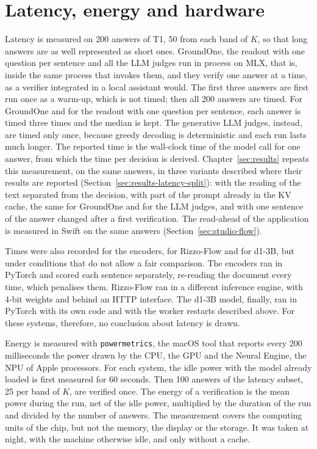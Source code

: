 \section{Latency, energy and hardware}
\label{sec:setup-protocol}

Latency is measured on 200 answers of T1, 50 from each band of $K$, so that long answers are as well represented as
short ones. GroundOne, the readout with one question per sentence and all the LLM judges run in process on MLX,
that is, inside the same process that invokes them, and they verify one answer at a time, as a verifier integrated in a
local assistant would. The first three answers are first run once as a warm-up, which is not timed; then all 200 answers are timed. For GroundOne and
for the readout with one question per sentence, each answer is timed three times and the median is kept. The generative
LLM judges, instead, are timed only once, because greedy decoding is deterministic and each run lasts much longer. The
reported time is the wall-clock time of the model call for one answer, from which the time per decision is derived. Chapter~\ref{sec:results} repeats this measurement, on the same answers, in three variants described where their results are reported (Section~\ref{sec:results-latency-split}): with the reading of the text separated from the decision, with part of the prompt already in the KV cache, the same for GroundOne and for the LLM judges, and with one sentence of the answer changed after a first verification. The read-ahead of the application is measured in Swift on the same answers (Section~\ref{sec:studio-flow}).

Times were also recorded for the encoders, for Rizzo-Flow and for d1-3B, but under conditions that do not allow a fair
comparison. The encoders ran in PyTorch and scored each sentence separately, re-reading the document every time, which
penalises them. Rizzo-Flow ran in a different inference engine, with 4-bit weights and behind an HTTP interface. The
d1-3B model, finally, ran in PyTorch with its own code and with the worker restarts described above. For these systems,
therefore, no conclusion about latency is drawn.

Energy is measured with \texttt{powermetrics}, the macOS tool that reports every 200 milliseconds the power drawn by the
CPU, the GPU and the Neural Engine, the NPU of Apple processors. For each system, the idle power with the model already
loaded is first measured for 60 seconds. Then 100 answers of the latency subset, 25 per band of $K$, are verified once.
The energy of a verification is the mean power during the run, net of the idle power, multiplied by the duration of the
run and divided by the number of answers. The measurement covers the computing units of the chip, but not the memory,
the display or the storage. It was taken at night, with the machine otherwise idle, and only without a cache.

